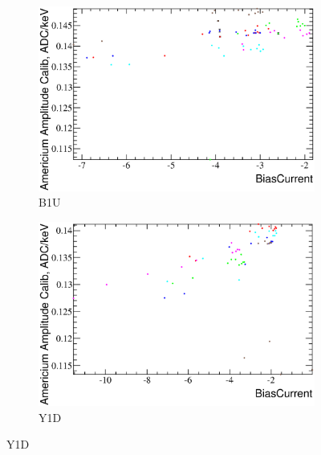 \documentclass[a4paper,12pt]{article}
\begin{document}
\begin{figure}[htb]
\begin{subfigure}[t]{0.49\textwidth}
\includegraphics[width=\textwidth]{gfx/run12_alpha/B1U/c_hBiasCurrent_AmGain.eps}
\caption{B1U}
\end{subfigure}
%
\hfill
%
\begin{subfigure}[t]{0.49\textwidth}
\includegraphics[width=\textwidth]{gfx/run12_alpha/Y1D/c_hBiasCurrent_AmGain.eps}
\caption{Y1D}
\end{subfigure}


\end{figure}
\end{document}
